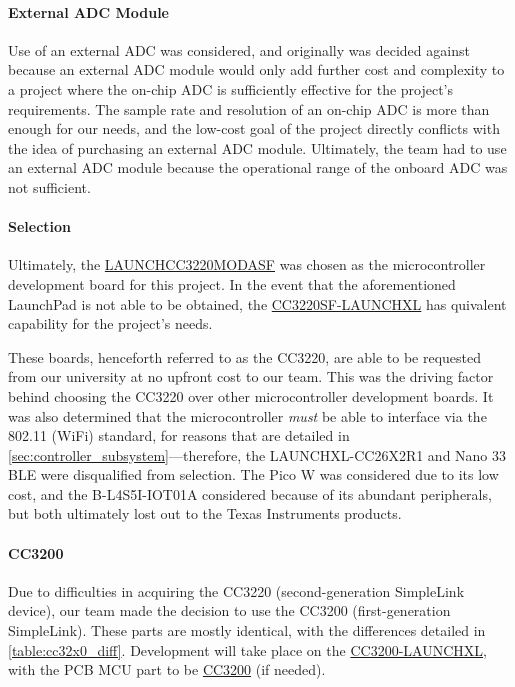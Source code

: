 \paragraph{External ADC Module} Use of an external ADC was considered, and originally was decided against because an external ADC module would only add further cost and complexity to a project where the on-chip ADC is sufficiently effective for the project's requirements. The sample rate and resolution of an on-chip ADC is more than enough for our needs, and the low-cost goal of the project directly conflicts with the idea of purchasing an external ADC module.
Ultimately, the team had to use an external ADC module because the operational range of the onboard ADC was not sufficient.

\paragraph{Selection} Ultimately, the \href{https://www.ti.com/tool/LAUNCHCC3220MODASF}{LAUNCHCC3220MODASF} was chosen as the microcontroller development board for this project. In the event that the aforementioned LaunchPad is not able to be obtained, the \href{https://www.ti.com/tool/CC3220SF-LAUNCHXL}{CC3220SF-LAUNCHXL} has  quivalent capability for the project's needs.

These boards, henceforth referred to as the CC3220, are able to be requested from our university at no upfront cost to our team. This was the driving factor behind choosing the CC3220 over other microcontroller development boards. It was also determined that the microcontroller \emph{must} be able to interface via the 802.11 (WiFi) standard, for reasons that are detailed in \autoref{sec:controller_subsystem}---therefore, the LAUNCHXL-CC26X2R1 and Nano 33 BLE were disqualified from selection. The Pico W was considered due to its low cost, and the B-L4S5I-IOT01A considered because of its abundant peripherals, but both ultimately lost out to the Texas Instruments products.

\paragraph{CC3200} Due to difficulties in acquiring the CC3220 (second-generation SimpleLink device), our team made the decision to use the CC3200 (first-generation SimpleLink). These parts are mostly identical, with the differences detailed in \autoref{table:cc32x0_diff}. Development will take place on the \href{https://www.ti.com/tool/CC3200-LAUNCHXL}{CC3200-LAUNCHXL}, with the PCB MCU part to be \href{https://www.ti.com/product/CC3200}{CC3200} (if needed).


